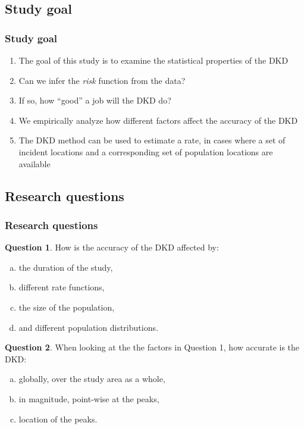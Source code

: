 \documentclass[notheorems]{beamer}
\theoremstyle{definition}
\newtheorem{researchquestion}{Question}
\theoremstyle{example}
\begin{document}
\subsection{Study goal}
\begin{frame}\frametitle{Study goal}
    \begin{enumerate}
        \item The goal of this study is to examine the statistical properties of the DKD
        \item Can we infer the \emph{risk} function from the data?
        \item If so, how ``good'' a job will the DKD do?
        \item We empirically analyze how different factors affect the accuracy of the DKD
        \item The DKD method can be used to estimate a rate,
            in cases where a set of incident locations and a corresponding set of population locations are available 
    \end{enumerate}
\end{frame}

\subsection{Research questions}
\begin{frame}\frametitle{Research questions}
    \begin{researchquestion}{How is the accuracy of the DKD affected by:}
        \begin{enumerate}[a)]
            \item the duration of the study, \label{thm:accuracy-affected:duration}%
            \item different rate functions, \label{thm:accuracy-affected:rates}%
            \item the size of the population, \label{thm:accuracy-affected:popsize}%
            \item and different population distributions. \label{thm:accuracy-affected:popdist}%
        \end{enumerate}
    \end{researchquestion}
    \begin{researchquestion}{When looking at the the factors in Question 1,
    how accurate is the DKD:}
        \begin{enumerate}[a)]
            \item globally, over the study area as a whole, \label{thm:accuracy-scale:global}%
            \item in magnitude, point-wise at the peaks, \label{thm:accuracy-scale:peaks}%
            \item location of the peaks. \label{thm:accuracy-scale:peaks-location}%
        \end{enumerate}
    \end{researchquestion}
\end{frame}
\end{document}

